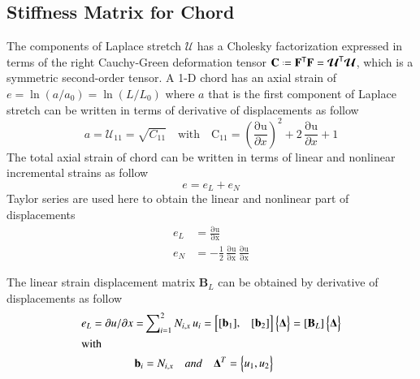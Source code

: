 \subsection{Stiffness Matrix for Chord}
The components of Laplace stretch $\boldsymbol{\mathcal{U}}$ has a Cholesky factorization expressed in terms of the right Cauchy-Green deformation tensor $\mathbf{C} \defeq \mathbf{F}^{\mathsf{T}} \mathbf{F} = \boldsymbol{\mathcal{U}}^{\mathsf{T}} \boldsymbol{\mathcal{U}}$, which is a symmetric second-order tensor. 
A 1-D chord has an axial strain of $e = \ln ( a / a_0 ) = \ln ( L / L_0 )$ 
where $a$ that is the first component of Laplace stretch can be written in terms of derivative of displacements as follow
\begin{equation}
a = {\mathcal{U}}_{11} = \sqrt{C_{11}}  \quad \text{with} \quad \mathrm{C_{11}} = \left(\frac{\mathrm{\partial u}}{\partial x}\right)^2 + 2\, \frac{\mathrm{\partial u}}{\partial x}  + 1
\end{equation} 
The total axial strain of chord can be written in terms of linear and nonlinear incremental strains as follow
\begin{equation}
 e = e_{L} + e_{N}
\end{equation}
Taylor series are used here to obtain the linear and nonlinear part of displacements 
\begin{subequations}
	\begin{align}
	e_{L} & = \mathrm{\frac{\partial u}{\partial x}} \\
	e_{N} & = -\frac{1}{2} \, \mathrm{\frac{\partial u}{\partial x}}\, \mathrm{\frac{\partial u}{\partial x}} 
	\end{align}
\end{subequations}

The linear strain displacement matrix $\mathbf{B}_L$ can be obtained by derivative of displacements as follow
\begin{subequations}
	\begin{align}
e_L  = 
\partial u / \partial x   = &
\sum\nolimits_{i=1}^2 N_{i,x} \, u_i = \begin{bmatrix}
[\mathbf{b}_1], & [\mathbf{b}_2]
\end{bmatrix}  \begin{Bmatrix} \boldsymbol{\Delta} \end{Bmatrix}  
= [\mathbf{B}_L] \begin{Bmatrix} \boldsymbol{\Delta} \end{Bmatrix}\\
 \intertext{with} \mathbf{b}_i  &= 
N_{i,x} \quad {and} \quad
\mathbf{\Delta}^T  = 
\begin{Bmatrix}
u_1 ,u_2
\end{Bmatrix} 
\end{align}
\end{subequations}


